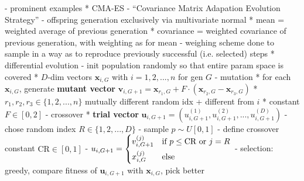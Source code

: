 \documentclass[twoside,11pt]{article}
\begin{document}
- prominent examples
  * CMA-ES
    - ``Covariance Matrix Adapation Evolution Strategy''
    - offspring generation exclusively via multivariate normal \citep[p. 8]{hansen2023cmaevolutionstrategytutorial}
      * mean = weighted average of previous generation
      * covariance = weighted covariance of previous generation, with weighting as for mean
    - weighing scheme done to sample in a way as to reproduce previously successful (i.e. selected) steps \citep[p. 11]{hansen2023cmaevolutionstrategytutorial}
  * differential evolution \citep[-]{differential_evolution}
    - init population randomly so that entire param space is covered
      * $D$-dim vectors $\boldsymbol{x}_{i,G}$ with $i=1,2,...,n$ for gen $G$
    - mutation
      * for each $\boldsymbol{x}_{i,G}$, generate \textbf{mutant vector} $\boldsymbol{v}_{i,G+1}=\boldsymbol{x}_{r_1,G}+F\cdot(\boldsymbol{x}_{r_2,G}-\boldsymbol{x}_{r_3,G})$
      * $r_1,r_2,r_3\in\{1,2,...,n\}$ mutually different random idx + different from $i$
      * constant $F\in[0,2]$
    - crossover
      * \textbf{trial vector} $\boldsymbol{u}_{i,G+1}=(u_{i,G+1}^{(1)},u_{i,G+1}^{(2)},...,u_{i,G+1}^{(D)})$
        - chose random index $R\in\{1,2,...,D\}$
        - sample $p\sim U[0,1]$
        - define crossover constant $\text{CR}\in[0,1]$
        - $u_{i,G+1} = \begin{dcases}
          v_{i,G+1}^{(j)} & \text{if } p\le\text{CR}\text{ or } j=R \\
          x_{i,G}^{(j)} & \text{else}
         \end{dcases}$
    - selection: greedy, compare fitness of $\boldsymbol{u}_{i,G+1}$ with $\boldsymbol{x}_{i,G}$, pick better
\end{document}
